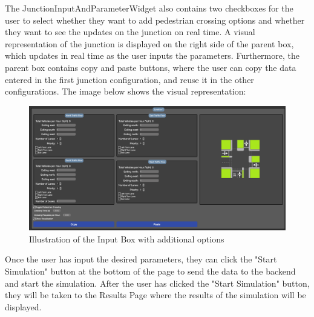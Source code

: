 \documentclass{article}
\begin{document}
    The JunctionInputAndParameterWidget also contains two checkboxes for the user to select whether they want to add pedestrian crossing options and whether they want to see the updates on the junction on real time. A visual representation of the
    junction is displayed on the right side of the parent box, which updates in real time as the user inputs the parameters. Furthermore, the parent box contains copy and paste buttons, where the user can copy the data entered
    in the first junction configuration, and reuse it in the other configurations. The image below shows the visual representation:

    \begin{figure}[H]
        \centering
        \includegraphics[width=\textwidth]{inputExtra.png}
        \caption{Illustration of the Input Box with additional options}
        \label{fig:inputExtra}
    \end{figure}

    Once the user has input the desired parameters, they can click the "Start Simulation" button at the bottom of the page to send the data to the backend and start the simulation. After the user has clicked the "Start Simulation" button, they
    will be taken to the Results Page where the results of the simulation will be displayed.
\end{document}
